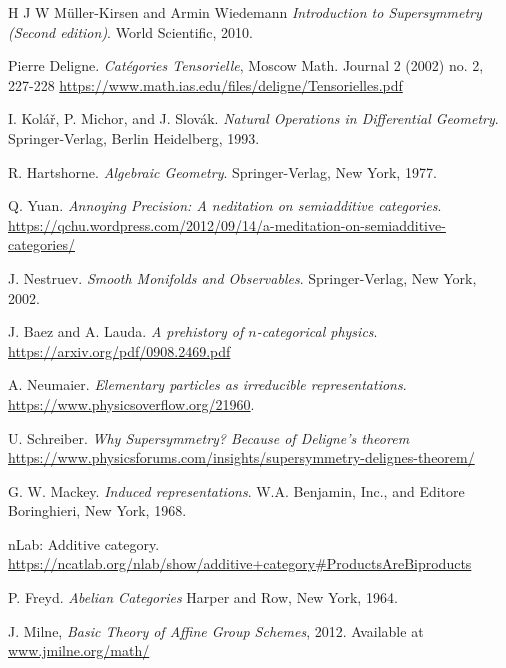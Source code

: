 \documentclass[a4paper,12pt]{scrbook}
\begin{document}
\begin{thebibliography}{9}
   H J W M{\"u}ller-Kirsen and Armin Wiedemann
    \textit{Introduction to Supersymmetry (Second edition)}.
    World Scientific, 2010.

   Pierre Deligne.
    \textit{Cat{\'e}gories Tensorielle},
    Moscow Math. Journal 2 (2002) no. 2, 227-228
    \url{https://www.math.ias.edu/files/deligne/Tensorielles.pdf}

   I. Kol\'{a}\v{r}, P. Michor, and J. Slov\'{a}k.
    \textit{Natural Operations in Differential Geometry}.
    Springer-Verlag, Berlin Heidelberg, 1993.

   R. Hartshorne.
    \textit{Algebraic Geometry}.
    Springer-Verlag, New York, 1977.

   Q. Yuan.
    \textit{Annoying Precision: A neditation on semiadditive categories}.
    \url{https://qchu.wordpress.com/2012/09/14/a-meditation-on-semiadditive-categories/}

   J. Nestruev.
    \textit{Smooth Monifolds and Observables}.
    Springer-Verlag, New York, 2002.

   J. Baez and A. Lauda.
    \textit{A prehistory of $n$-categorical physics}.
    \url{https://arxiv.org/pdf/0908.2469.pdf}

   A. Neumaier.
    \textit{Elementary particles as irreducible representations}.
    \url{https://www.physicsoverflow.org/21960}.

   U. Schreiber.
    \textit{Why Supersymmetry? Because of Deligne's theorem}
    \url{https://www.physicsforums.com/insights/supersymmetry-delignes-theorem/}

   G. W. Mackey.
    \textit{Induced representations}.
    W.A. Benjamin, Inc., and Editore Boringhieri, New York, 1968.

   nLab: Additive category.
    \url{https://ncatlab.org/nlab/show/additive+category#ProductsAreBiproducts}

   P. Freyd.
    \textit{Abelian Categories}
    Harper and Row, New York, 1964.

   J. Milne,
    \textit{Basic Theory of Affine Group Schemes},
    2012.
    Available at \url{www.jmilne.org/math/}


\end{thebibliography}
\end{document}
